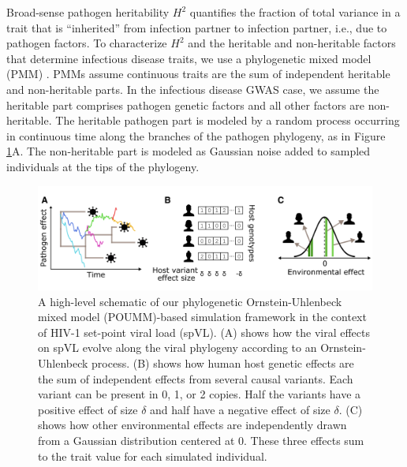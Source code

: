 \documentclass[11pt]{article}
\begin{document}
\begin{linenumbers}
Broad-sense pathogen heritability $H^2$ quantifies the fraction of total variance in a trait that is ``inherited'' from infection partner to infection partner, i.e., due to pathogen factors. To characterize $H^2$ and the heritable and non-heritable factors that determine infectious disease traits, we use a phylogenetic mixed model (PMM) \citep{Housworth2004}. PMMs assume continuous traits are the sum of independent heritable and non-heritable parts. In the infectious disease GWAS case, we assume the heritable part comprises pathogen genetic factors and all other factors are non-heritable. The heritable pathogen part is modeled by a random process occurring in continuous time along the branches of the pathogen phylogeny, as in Figure \ref{fig:spVLModel}A. The non-heritable part is modeled as Gaussian noise added to sampled individuals at the tips of the phylogeny.

\begin{figure}[H]
	\begin{center}
	\includegraphics[width = \linewidth]{figures/simulation_setup.png}
	\caption{A high-level schematic of our phylogenetic Ornstein-Uhlenbeck mixed model (POUMM)-based simulation framework in the context of HIV-1 set-point viral load (spVL). (A) shows how the viral effects on spVL evolve along the viral phylogeny according to an Ornstein-Uhlenbeck process. (B) shows how human host genetic effects are the sum of independent effects from several causal variants. Each variant can be present in 0, 1, or 2 copies. Half the variants have a positive effect of size $\delta$ and half have a negative effect of size $\delta$. (C) shows how other environmental effects are independently drawn from a Gaussian distribution centered at 0. These three effects sum to the trait value for each simulated individual.}
		\label{fig:spVLModel}
	\end{center}
\end{figure}


\end{linenumbers}
\end{document}
